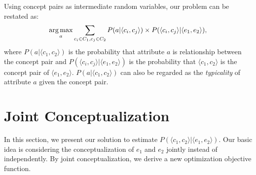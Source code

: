 Using concept pairs as intermediate random variables, our problem can be restated as:
\begin{equation}
\label{eq:target}
\small
\argmax_a \sum_{c_i\in C_1 , c_j \in C_2 }P(a|\langle c_{i},c_{j}\rangle)\times P(\langle c_{i},c_{j}\rangle|\langle e_{1},e_{2}\rangle),
\end{equation}
where $P(a|\langle c_{1},c_{2}\rangle)$ is the probability that attribute $a$ is relationship between the concept pair
and $P(\langle c_{i},c_{j}\rangle |\langle e_{1},e_{2}\rangle)$ is the probability that $\langle c_1, c_2\rangle$ is the concept pair of $ \langle e_1, e_2 \rangle $.
$P(a| \langle c_{1},c_{2} \rangle )$ can also be regarded as the {\it typicality} of attribute $a$ given the concept pair.

\section{Joint Conceptualization}
In this section, we present our solution to estimate $ P(\langle c_1,c_2 \rangle | \langle e_1,e_2\rangle) $.
Our basic idea is considering the conceptualization of $e_1$ and $e_2$ jointly instead of independently.
By joint conceptualization, we derive a new optimization objective function.


